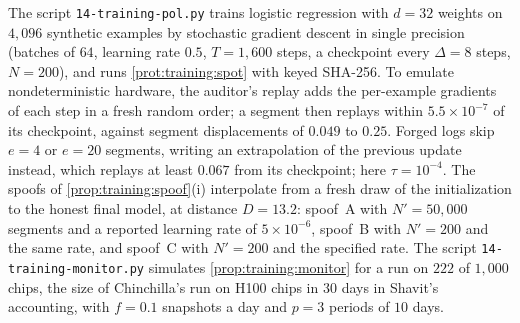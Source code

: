 \begin{refsection}
The script \texttt{14-training-pol.py} trains logistic regression with $d=32$ weights on $4{,}096$ synthetic examples by stochastic gradient descent in single precision (batches of $64$, learning rate $0.5$, $T=1{,}600$ steps, a checkpoint every $\Delta=8$ steps, $N=200$), and runs \cref{prot:training:spot} with keyed SHA-256. To emulate nondeterministic hardware, the auditor's replay adds the per-example gradients of each step in a fresh random order; a segment then replays within $5.5\times10^{-7}$ of its checkpoint, against segment displacements of $0.049$ to $0.25$. Forged logs skip $e=4$ or $e=20$ segments, writing an extrapolation of the previous update instead, which replays at least $0.067$ from its checkpoint; here $\tau=10^{-4}$. The spoofs of \cref{prop:training:spoof}(i) interpolate from a fresh draw of the initialization to the honest final model, at distance $D=13.2$: spoof~A with $N'=50{,}000$ segments and a reported learning rate of $5\times10^{-6}$, spoof~B with $N'=200$ and the same rate, and spoof~C with $N'=200$ and the specified rate. The script \texttt{14-training-monitor.py} simulates \cref{prop:training:monitor} for a run on $222$ of $1{,}000$ chips, the size of Chinchilla's run on H100 chips in $30$ days in Shavit's accounting, with $f=0.1$ snapshots a day and $p=3$ periods of $10$ days.


\end{refsection}

